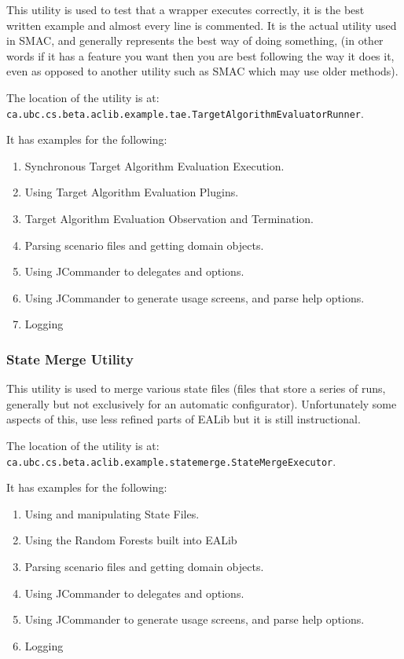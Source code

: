 \documentclass[11pt,letterpaper,oneside]{article}
\begin{document}
This utility is used to test that a wrapper executes correctly, it is the best written example and almost every line is commented. It is the actual utility used in SMAC, and generally represents the best way of doing something, (in other words if it has a feature you want then you are best following the way it does it, even as opposed to another utility such as SMAC which may use older methods).

The location of the utility is at:\\ \texttt{ca.ubc.cs.beta.aclib.example.tae.TargetAlgorithmEvaluatorRunner}.

It has examples for the following:

\begin{enumerate}
\item Synchronous Target Algorithm Evaluation Execution.
\item Using Target Algorithm Evaluation Plugins.
\item Target Algorithm Evaluation Observation and Termination.
\item Parsing scenario files and getting domain objects.
\item Using JCommander to delegates and options.
\item Using JCommander to generate usage screens, and parse help options.
\item Logging
\end{enumerate}

\subsubsection{State Merge Utility}

This utility is used to merge various state files (files that store a series of runs, generally but not exclusively for an automatic configurator). Unfortunately some aspects of this, use less refined parts of EALib but it is still instructional.


The location of the utility is at:\\ \texttt{ca.ubc.cs.beta.aclib.example.statemerge.StateMergeExecutor}.

It has examples for the following:

\begin{enumerate}
\item Using and manipulating State Files.
\item Using the Random Forests built into EALib
\item Parsing scenario files and getting domain objects.
\item Using JCommander to delegates and options.
\item Using JCommander to generate usage screens, and parse help options.
\item Logging
\end{enumerate}
\end{document}

